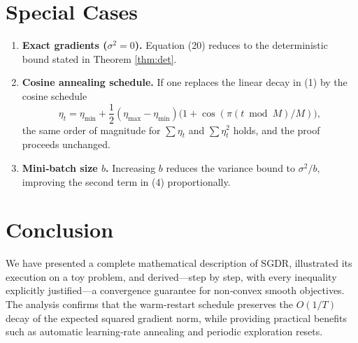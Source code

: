 \documentclass{article}
\begin{document}
\section*{Special Cases}
\begin{enumerate}[label=\alph*)]
    \item \textbf{Exact gradients ($\sigma^{2}=0$).} Equation (20) reduces to the deterministic bound stated in Theorem \ref{thm:det}.
    \item \textbf{Cosine annealing schedule.} If one replaces the linear decay in (1) by the cosine schedule
    \[
        \eta_t=\eta_{\min}+\frac12(\eta_{\max}-\eta_{\min})
               \bigl(1+\cos(\pi (t\bmod M)/M)\bigr),
    \]
    the same order of magnitude for $\sum\eta_t$ and $\sum\eta_t^{2}$ holds, and the proof proceeds unchanged.
    \item \textbf{Mini‑batch size $b$.} Increasing $b$ reduces the variance bound to $\sigma^{2}/b$, improving the second term in (4) proportionally.
\end{enumerate}

\section*{Conclusion}
We have presented a complete mathematical description of SGDR, illustrated its execution on a toy problem, and derived—step by step, with every inequality explicitly justified—a convergence guarantee for non‑convex smooth objectives.  The analysis confirms that the warm‑restart schedule preserves the $O(1/T)$ decay of the expected squared gradient norm, while providing practical benefits such as automatic learning‑rate annealing and periodic exploration resets.
\end{document}
